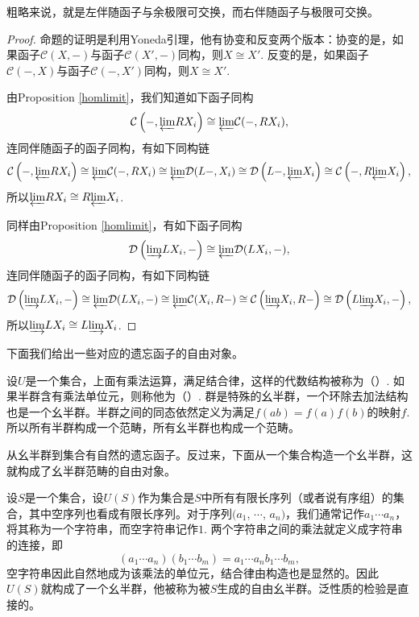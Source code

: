 粗略来说，就是左伴随函子与余极限可交换，而右伴随函子与极限可交换。

\begin{proof}
	命题的证明是利用Yoneda引理，他有协变和反变两个版本：协变的是，如果函子$\mathcal{C}(X,-)$与函子$\mathcal{C}(X',-)$同构，则$X\cong X'$. 反变的是，如果函子$\mathcal{C}(-,X)$与函子$\mathcal{C}(-,X')$同构，则$X\cong X'$.

	由Proposition \ref{homlimit}，我们知道如下函子同构
	\[
	\mathcal{C}\left(-,{\varprojlim} RX_i\right)\cong {\varprojlim} \mathcal{C}(-,RX_i),
	\]
	连同伴随函子的函子同构，有如下同构链
	\[
	\mathcal{C}\left(-,{\varprojlim} RX_i\right)\cong {\varprojlim} \mathcal{C}(-,RX_i)\cong {\varprojlim} \mathcal{D}(L-,X_i)\cong \mathcal{D}\left(L-,{\varprojlim} X_i\right)\cong \mathcal{C}\left(-,R{\varprojlim} X_i\right),
	\]
	所以${\varprojlim} RX_i\cong R{\varprojlim} X_i$.

	同样由Proposition \ref{homlimit}，有如下函子同构
	\[
	\mathcal{D}\left({\varinjlim} LX_i,-\right)\cong {\varprojlim} \mathcal{D}(LX_i,-),
	\]
	连同伴随函子的函子同构，有如下同构链
	\[
	\mathcal{D}\left({\varinjlim} LX_i,-\right)\cong {\varprojlim} \mathcal{D}(LX_i,-)\cong {\varprojlim} \mathcal{C}(X_i,R-)\cong \mathcal{C}\left({\varinjlim} X_i,R-\right)\cong \mathcal{D}\left(L{\varinjlim} X_i,-\right),
	\]
	所以${\varinjlim} LX_i\cong L{\varinjlim} X_i$.
\end{proof}

下面我们给出一些对应的遗忘函子的自由对象。

\begin{para}
设$U$是一个集合，上面有乘法运算，满足结合律，这样的代数结构被称为（）. 如果半群含有乘法单位元，则称他为（）. 群是特殊的幺半群，一个环除去加法结构也是一个幺半群。半群之间的同态依然定义为满足$f(ab)=f(a)f(b)$的映射$f$. 所以所有半群构成一个范畴，所有幺半群也构成一个范畴。

从幺半群到集合有自然的遗忘函子。反过来，下面从一个集合构造一个幺半群，这就构成了幺半群范畴的自由对象。

设$S$是一个集合，设$U(S)$作为集合是$S$中所有有限长序列（或者说有序组）的集合，其中空序列也看成有限长序列。对于序列$(a_1$, $\cdots$, $a_n)$，我们通常记作$a_1\cdots a_n$，将其称为一个字符串，而空字符串记作$1$. 两个字符串之间的乘法就定义成字符串的连接，即
\[
	(a_1\cdots a_n)(b_1\cdots b_m)=a_1\cdots a_nb_1\cdots b_m,
\]
空字符串因此自然地成为该乘法的单位元，结合律由构造也是显然的。因此$U(S)$就构成了一个幺半群，他被称为被$S$生成的自由幺半群。泛性质的检验是直接的。
\end{para}

